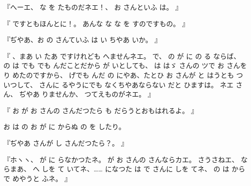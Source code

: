 『へーエ、
な
を
たものだネエ！、
お
さんといふ
は。
』

『
ですともほんとに！。
あんな
な
な
を
すのですもの。
』

『ぢやあ、お
の
さんていふ
は
い
ちやあ
いか。
』

『
、まあ
い
たあ
ですけれども
へませんネエ。
で、
の
が
に
の
る
ならば、
の
は
でも
でも
んだことだから
が
いとしても、
は
はゞ
さんの
ツで
お
さんを
り
めたのですから、
げでも
んだ
の
にやあ、たとひ
お
さんが
と
はうとも
つ
いつして、
さんに
るやうにでも
なくちやあならない
だと
ひますは。
ネエ
さん、
ぢやあ
りませんか、
つてえものがネエ。
』

『
お
が
お
さんの
さんだつたら
も
だらうとおもはれるよ。
』

お
は
の
お
が
に
からぬ
の
を
したり。

『ぢやあ
さんが
し
さんだつたら？。
』

『ホヽヽ、
が
に
らなかつたネ。
が
お
さんの
さんならカエ。
さうさねエ、
ならまあ、
へ
しを
て
いてネ、……
になつた
は
で
さんに
しを
てネ、
の
は
から
で
めやうと
ふネ。
』

